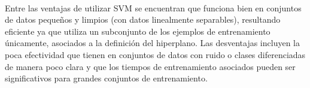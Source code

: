 \paragraph{}Entre las ventajas de utilizar SVM se encuentran que funciona bien en conjuntos de datos pequeños y limpios (con datos linealmente separables), resultando eficiente ya que utiliza un subconjunto de los ejemplos de entrenamiento únicamente, asociados a la definición del hiperplano. Las desventajas incluyen la poca efectividad que tienen en conjuntos de datos con ruido o clases diferenciadas de manera poco clara y que los tiempos de entrenamiento asociados pueden ser significativos para grandes conjuntos de entrenamiento.